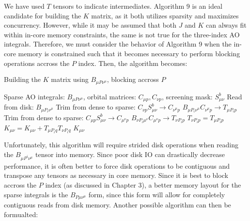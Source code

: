 We have used $T$ tensors to indicate intermediates.
Algorithm 9 is an ideal candidate for building the $K$ matrix, as it both utilizes sparsity and maximizes concurrency.
However, while it may be assumed that both $J$ and $K$ can always fit within in-core memory constraints, the same is not true 
for the three-index AO integrals. Therefore, we must consider the behavior of Algorithm 9 when the 
in-core memory is constrained such that it becomes necessary to perform blocking operations accross the $P$ index. Then, the algorithm
becomes: 

\begin{algorithm}[H]
\caption{Building the $K$ matrix using $B_{\mu P \nu^\mu}$, blocking accross $P$}
\begin{algorithmic}
\REQUIRE Sparse AO integrals: $B_{\mu P \nu^\mu}$, orbital matrices: $C_{\mu p}, C_{\nu p}$, screening mask: $S_{\mu \nu}^b$
    \STATE Read from disk: $B_{\mu P_i \nu^{\mu}}$
        \STATE Trim from dense to sparse: $C_{\nu p}S_{\mu \nu}^b \rightarrow C_{\nu^{\mu} p}$
        \STATE $B_{\mu P_i \nu^{\mu}} C_{\nu^{\mu} p} \rightarrow T_{\mu P_i p}$
            \STATE Trim from dense to sparse: $C_{\mu p}S_{\mu \nu}^b \rightarrow C_{\mu^{\nu} p}$
            \STATE $B_{\nu P_i \mu^{\nu}} C_{\mu^{\nu} p} \rightarrow T_{\nu P_i p}$
        \ELSE
            \STATE $T_{\nu P_i p} = T_{\mu P_i p}$ 
        \ENDIF
    \ENDFOR
    \STATE $K_{\mu \nu} = K_{\mu \nu} + T_{\mu P_i q} T_{\nu P_i q}$
\ENDFOR
\RETURN $K_{\mu \nu}$
\end{algorithmic}
\end{algorithm}

\noindent Unfortunately, this algorithm will require strided disk operations when reading the $B_{\mu P^i \nu^{\mu}}$ tensor into memory.
Since poor disk IO can drastically decrease performance, it is often better to force disk operations 
to be contiguous and transpose any tensors as necessary in core memory. Since it is best to block accross the $P$ index (as discussed in
Chapter 3), a better
memory layout for the sparse integrals is the $B_{P \mu \nu^\mu}$ form, since this form will allow for completely 
contiguous reads from disk memory. Another possible algorithm can then be formualted:

